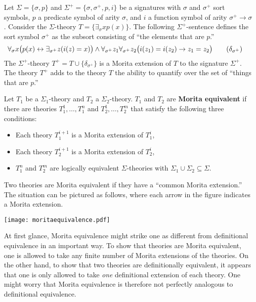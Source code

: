 \begin{example}
\label{extensionexample}
Let $\Sigma=\{\sigma, p\}$ and $\Sigma^+=\{\sigma, \sigma^+, p, i\}$
be a signatures with $\sigma$ and $\sigma^+$ sort symbols, $p$ a
predicate symbol of arity $\sigma$, and $i$ a function symbol of arity
$\sigma^+\rightarrow\sigma$. Consider the $\Sigma$-theory
$T=\{\exists_\sigma x p(x)\}$. The following $\Sigma^+$-sentence
defines the sort symbol $\sigma^+$ as the subsort consisting of ``the
elements that are $p$.''
\begin{align*}
&\forall_{\sigma}x\big(p(x)\leftrightarrow\exists_{\sigma^+} z(i(z)=x)\big)\land\forall_{\sigma^+}z_1\forall_{\sigma^+}z_2\big(i(z_1)=i(z_2)\rightarrow z_1=z_2\big)\tag{$\delta_{\sigma^+}$}
\end{align*}
The $\Sigma^+$-theory $T^+=T\cup\{\delta_{\sigma^+}\}$ is a Morita
extension of $T$ to the signature $\Sigma^+$. The theory $T^+$ adds to
the theory $T$ the ability to quantify over the set of ``things that
are $p$.''
\end{example}


\begin{defn}
Let $T_1$ be a $\Sigma_1$-theory and $T_2$ a $\Sigma_2$-theory. $T_1$ and $T_2$ are \textbf{Morita equivalent} if there are theories $T_1^1, \ldots, T_1^n$ and $T_2^1,\ldots, T_2^m$ that satisfy the following three conditions:
\begin{itemize}
\item Each theory $T_1^{i+1}$ is a Morita extension of $T_1^{i}$,
\item Each theory $T_2^{i+1}$ is a Morita extension of $T_2^i$,
\item $T_1^n$ and $T_2^m$ are logically equivalent $\Sigma$-theories
  with $\Sigma_1\cup\Sigma_2\subseteq\Sigma$.
\end{itemize}
\end{defn}

Two theories are Morita equivalent if they have a ``common Morita
extension.'' The situation can be pictured as follows, where each
arrow in the figure indicates a Morita extension.
\begin{center}
\texttt{[image: moritaequivalence.pdf]}
\end{center}

At first glance, Morita equivalence might strike one as different from
definitional equivalence in an important way. To show that theories
are Morita equivalent, one is allowed to take any finite number of
Morita extensions of the theories. On the other hand, to show that two
theories are definitionally equivalent, it appears that one is only
allowed to take \textit{one} definitional extension of each
theory. One might worry that Morita equivalence is therefore not
perfectly analogous to definitional equivalence.

